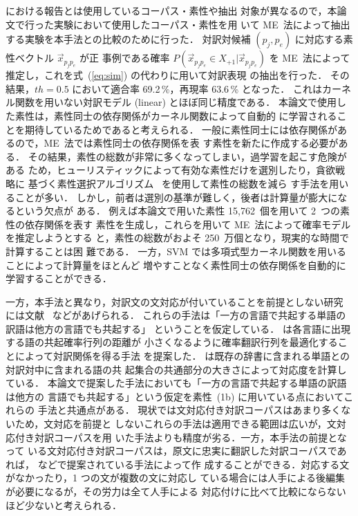 \cite{satoken_NLP02} における報告とは使用しているコーパス・素性や抽出
対象が異なるので，本論文で行った実験において使用したコーパス・素性を用
いて ME~法によって抽出する実験を本手法との比較のために行った．
対訳対候補 $(p_j,p_e)$ に対応する素性ベクトル $\vec{x}_{p_j p_e}$ が正
事例である確率 $P(\vec{x}_{p_j p_e} \in X_{+1}|\vec{x}_{p_j p_e})$ を
ME~法によって推定し，これを式~(\ref{eq:sim}) の代わりに用いて対訳表現
の抽出を行った．
その結果，$th=0.5$ において適合率 69.2\,\%，再現率 63.6\,\% となった．
これはカーネル関数を用いない対訳モデル (linear) とほぼ同じ精度である．
本論文で使用した素性は，素性同士の依存関係がカーネル関数によって自動的
に学習されることを期待しているためであると考えられる．
一般に素性同士には依存関係があるので，ME~法では素性同士の依存関係を表
す素性を新たに作成する必要がある．
その結果，素性の総数が非常に多くなってしまい，過学習を起こす危険がある
ため，ヒューリスティックによって有効な素性だけを選別したり，貪欲戦略に
基づく素性選択アルゴリズム~\cite{berger_96} を使用して素性の総数を減ら
す手法を用いることが多い．
しかし，前者は選別の基準が難しく，後者は計算量が膨大になるという欠点が
ある．
例えば本論文で用いた素性 15,762~個を用いて 2~つの素性の依存関係を表す
素性を生成し，これらを用いて ME~法によって確率モデルを推定しようとする
と，素性の総数がおよそ 250~万個となり，現実的な時間で計算することは困
難である．
一方，SVM では多項式型カーネル関数を用いることによって計算量をほとんど
増やすことなく素性同士の依存関係を自動的に学習することができる．

一方，本手法と異なり，対訳文の文対応が付いていることを前提としない研究
には文献~\cite{tanaka_96,kaji_01} などがあげられる．
これらの手法は「一方の言語で共起する単語の訳語は他方の言語でも共起する」
ということを仮定している．
\cite{tanaka_96} は各言語に出現する語の共起確率行列の距離が
小さくなるように確率翻訳行列を最適化することによって対訳関係を得る手法
を提案した．
\cite{kaji_01} は既存の辞書に含まれる単語との対訳対中に含まれる語の共
起集合の共通部分の大きさによって対応度を計算している．
本論文で提案した手法においても「一方の言語で共起する単語の訳語は他方の
言語でも共起する」という仮定を素性~(1b) に用いている点においてこれらの
手法と共通点がある．
現状では文対応付き対訳コーパスはあまり多くないため，文対応を前提と
しないこれらの手法は適用できる範囲は広いが，文対応付き対訳コーパスを用
いた手法よりも精度が劣る．一方，本手法の前提となって
いる文対応付き対訳コーパスは，原文に忠実に翻訳した対訳コーパスであれば，
\cite{kay_93,utsuro_94,sukehiro_95} などで提案されている手法によって作
成することができる．対応する文がなかったり，1 つの文が複数の文に対応し
ている場合には人手による後編集が必要になるが，その労力は全て人手による
対応付けに比べて比較にならないほど少ないと考えられる．


